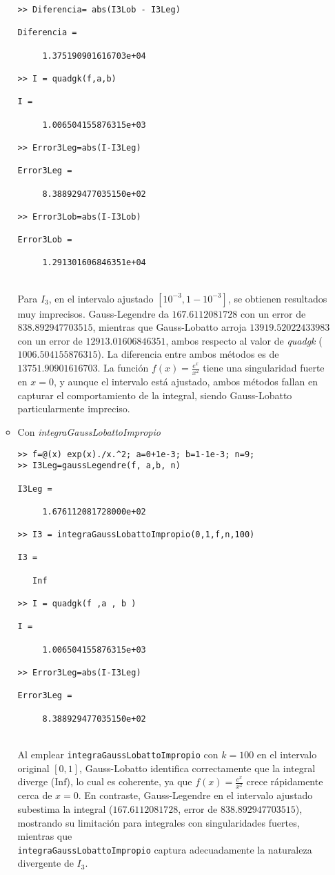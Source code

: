 \documentclass[a4paper]{article}
\begin{document}
\begin{itemize}
\begin{itemize}
\begin{lstlisting}[frame=single, style=Matlab-Pyglike]
>> Diferencia= abs(I3Lob - I3Leg)

Diferencia =

     1.375190901616703e+04

>> I = quadgk(f,a,b)

I =

     1.006504155876315e+03

>> Error3Leg=abs(I-I3Leg)

Error3Leg =

     8.388929477035150e+02

>> Error3Lob=abs(I-I3Lob)

Error3Lob =

     1.291301606846351e+04
    \end{lstlisting}
    \\
Para \( I_3 \), en el intervalo ajustado \( [10^{-3}, 1 - 10^{-3}] \), se obtienen resultados muy imprecisos. Gauss-Legendre da \( 167.6112081728 \) con un error de \( 838.892947703515 \), mientras que Gauss-Lobatto arroja \( 13919.52022433983 \) con un error de \( 12913.01606846351 \), ambos respecto al valor de \textit{quadgk} (\( 1006.504155876315 \)). La diferencia entre ambos métodos es de \( 13751.90901616703 \). La función \( f(x) = \frac{e^x}{x^2} \) tiene una singularidad fuerte en \( x = 0 \), y aunque el intervalo está ajustado, ambos métodos fallan en capturar el comportamiento de la integral, siendo Gauss-Lobatto particularmente impreciso.    
    \item Con \textit{integraGaussLobattoImpropio}
    \\
\begin{lstlisting}[frame=single, style=Matlab-Pyglike]
>> f=@(x) exp(x)./x.^2; a=0+1e-3; b=1-1e-3; n=9;
>> I3Leg=gaussLegendre(f, a,b, n)

I3Leg =

     1.676112081728000e+02

>> I3 = integraGaussLobattoImpropio(0,1,f,n,100)

I3 =

   Inf

>> I = quadgk(f ,a , b )

I =

     1.006504155876315e+03

>> Error3Leg=abs(I-I3Leg)

Error3Leg =

     8.388929477035150e+02
\end{lstlisting}
    \\
Al emplear \texttt{integraGaussLobattoImpropio} con \( k = 100 \) en el intervalo original \( [0, 1] \), Gauss-Lobatto identifica correctamente que la integral diverge (\( \text{Inf} \)), lo cual es coherente, ya que \( f(x) = \frac{e^x}{x^2} \) crece rápidamente cerca de \( x = 0 \). En contraste, Gauss-Legendre en el intervalo ajustado subestima la integral (\( 167.6112081728 \), error de \( 838.892947703515 \)), mostrando su limitación para integrales con singularidades fuertes, mientras que \\ \texttt{integraGaussLobattoImpropio} captura adecuadamente la naturaleza divergente de \( I_3 \).


\end{itemize}
\end{itemize}
\end{document}
